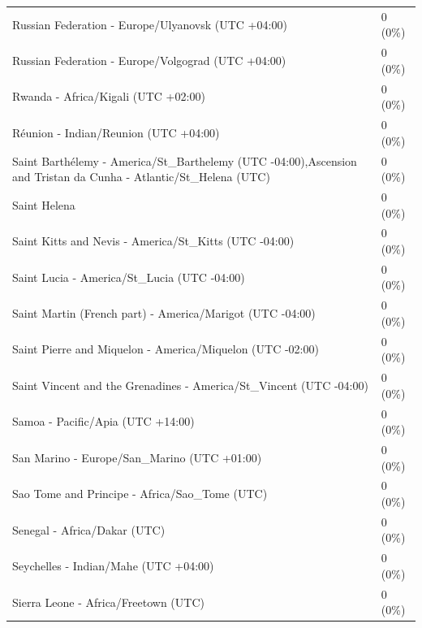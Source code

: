 \documentclass[
  english,
  man]{apa6}
\begin{document}
\begin{appendix}
\begin{table}
{\begin{tabular}[t]{ll}
\addlinespace
\hspace{1em}Russian Federation - Europe/Ulyanovsk (UTC +04:00) & 0 (0\%)\\
\hspace{1em}Russian Federation - Europe/Volgograd (UTC +04:00) & 0 (0\%)\\
\hspace{1em}Rwanda - Africa/Kigali (UTC +02:00) & 0 (0\%)\\
\hspace{1em}Réunion - Indian/Reunion (UTC +04:00) & 0 (0\%)\\
\hspace{1em}Saint Barthélemy - America/St\_Barthelemy (UTC -04:00),Ascension and Tristan da Cunha - Atlantic/St\_Helena (UTC) & 0 (0\%)\\
\addlinespace
\hspace{1em}Saint Helena & 0 (0\%)\\
\hspace{1em}Saint Kitts and Nevis - America/St\_Kitts (UTC -04:00) & 0 (0\%)\\
\hspace{1em}Saint Lucia - America/St\_Lucia (UTC -04:00) & 0 (0\%)\\
\hspace{1em}Saint Martin (French part) - America/Marigot (UTC -04:00) & 0 (0\%)\\
\hspace{1em}Saint Pierre and Miquelon - America/Miquelon (UTC -02:00) & 0 (0\%)\\
\addlinespace
\hspace{1em}Saint Vincent and the Grenadines - America/St\_Vincent (UTC -04:00) & 0 (0\%)\\
\hspace{1em}Samoa - Pacific/Apia (UTC +14:00) & 0 (0\%)\\
\hspace{1em}San Marino - Europe/San\_Marino (UTC +01:00) & 0 (0\%)\\
\hspace{1em}Sao Tome and Principe - Africa/Sao\_Tome (UTC) & 0 (0\%)\\
\hspace{1em}Senegal - Africa/Dakar (UTC) & 0 (0\%)\\
\addlinespace
\hspace{1em}Seychelles - Indian/Mahe (UTC +04:00) & 0 (0\%)\\
\hspace{1em}Sierra Leone - Africa/Freetown (UTC) & 0 (0\%)\\

\end{tabular}}
\end{table}
\end{appendix}
\end{document}
